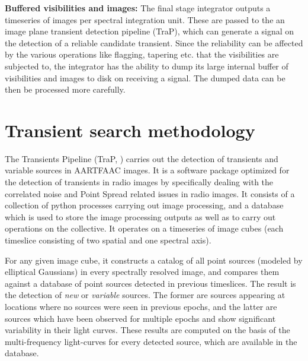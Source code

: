 \documentclass{ws-jai}
\begin{document}
\noindent \textbf {Buffered visibilities and images:} The final stage integrator
outputs a timeseries  of images per spectral integration unit.  These are passed
to the an image plane transient  detection pipeline (TraP), which can generate a
signal on the detection of a reliable candidate transient. Since the reliability
can be affected by the various operations like flagging, tapering etc.  that the
visibilities are subjected to, the integrator  has the ability to dump its large
internal buffer  of visibilities and images  to disk on receiving  a signal. The
dumped data can be then be processed more carefully.\\


\section {\label{sec:trap} Transient search methodology}
The  Transients  Pipeline  (TraP,  \citep{swinbank2015lofar})  carries  out  the
detection  of transients  and  variable sources  in AARTFAAC  images.   It is  a
software package  optimized for the detection  of transients in radio  images by
specifically dealing with  the correlated noise and Point  Spread related issues
in radio  images. It consists of  a collection of python  processes carrying out
image processing,  and a database  which is used  to store the  image processing
outputs as well as to carry out  operations on the collective.  It operates on a
timeseries of  image cubes  (each timeslice  consisting of  two spatial  and one
spectral axis). 

For any given image cube, it constructs  a catalog of all point sources (modeled
by elliptical Gaussians)  in every spectrally resolved image,  and compares them
against a database of point sources detected in previous timeslices.  The result
is the detection  of \textit{new} or \textit{variable} sources.   The former are
sources appearing  at locations where no  sources were seen in  previous epochs,
and the latter are sources which have been observed for multiple epochs and show
significant variability in their light curves. These results are computed on the
basis of the  multi-frequency light-curves for every detected  source, which are
available in the database.
\end{document}
